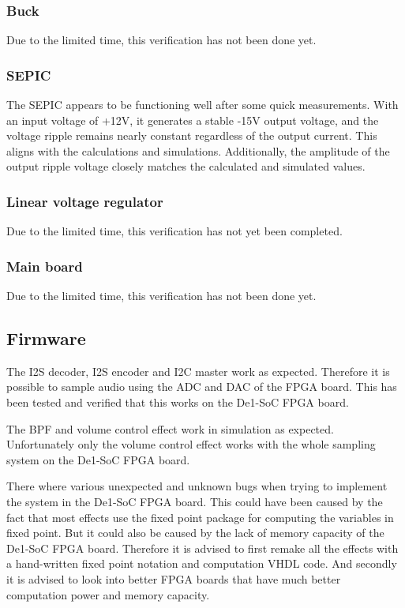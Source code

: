 \subsubsection{Buck}
Due to the limited time, this verification has not been done yet.

\subsubsection{SEPIC}
The SEPIC appears to be functioning well after some quick measurements. With an input voltage of +12V, it generates a stable -15V output voltage, and the voltage ripple remains nearly constant regardless of the output current. This aligns with the calculations and simulations. Additionally, the amplitude of the output ripple voltage closely matches the calculated and simulated values.

\subsubsection{Linear voltage regulator}
Due to the limited time, this verification has not yet been completed.

\subsubsection{Main board}
Due to the limited time, this verification has not been done yet.

\subsection{Firmware}
The I2S decoder, I2S encoder and I2C master work as expected. Therefore it is possible to sample audio using the ADC and DAC of the FPGA board. This has been tested and verified that this works on the De1-SoC FPGA board. 

The BPF and volume control effect work in simulation as expected. Unfortunately only the volume control effect works with the whole sampling system on the De1-SoC FPGA board. 

There where various unexpected and unknown bugs when trying to implement the system in the De1-SoC FPGA board. This could have been caused by the fact that most effects use the fixed point package for computing the variables in fixed point. But it could also be caused by the lack of memory capacity of the De1-SoC FPGA board. Therefore it is advised to first remake all the effects with a hand-written fixed point notation and computation VHDL code. And secondly it is advised to look into better FPGA boards that have much better computation power and memory capacity.


